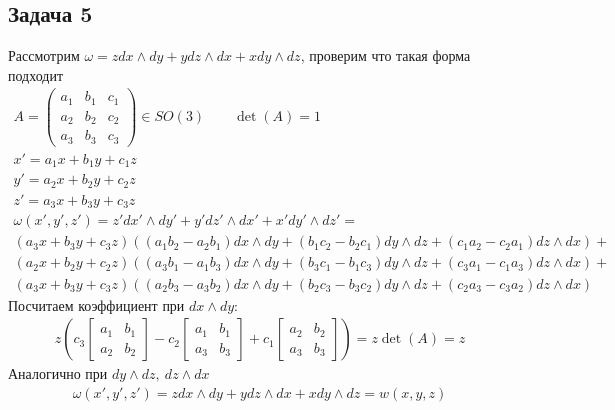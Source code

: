 \subsection*{Задача 5}
	Рассмотрим $\omega = z dx \wedge dy + y dz \wedge dx + x dy \wedge dz$, проверим что такая форма подходит
	\begin{gather*}
		A = 
		\begin{pmatrix}
			a_1 & b_1 & c_1\\
			a_2 & b_2 & c_2\\
			a_3 & b_3 & c_3
		\end{pmatrix}
		\in SO(3)\qquad \det(A) = 1\\
		x' = a_1 x  + b_1 y + c_1 z\\
		y' = a_2 x  + b_2 y + c_2 z\\
		z' = a_3 x  + b_3 y + c_3 z\\
		\omega(x',y',z') = 
		z'dx' \wedge dy'+ y'dz' \wedge dx' + x'dy' \wedge dz' =\\
		\left(a_3x + b_3y + c_3z\right)\left(\left(a_1b_2 - a_2b_1\right)dx \wedge dy + \left(b_1c_2 - b_2c_1\right)dy \wedge dz + \left(c_1a_2 - c_2a_1\right)dz \wedge dx\right) +\\
		\left(a_2x + b_2y + c_2z\right)\left(\left(a_3b_1 - a_1b_3\right)dx \wedge dy + \left(b_3c_1 - b_1c_3\right)dy \wedge dz + \left(c_3a_1 - c_1a_3\right)dz \wedge dx\right) +\\
		\left(a_3x + b_3y + c_3z\right)\left(\left(a_2b_3 - a_3b_2\right)dx \wedge dy + \left(b_2c_3 - b_3c_2\right)dy \wedge dz + \left(c_2a_3 - c_3a_2\right)dz \wedge dx\right)
	\end{gather*}
	Посчитаем коэффициент при $dx \wedge dy$:
	\begin{gather*}
		z\left(
		c_3
		\begin{bmatrix}
			a_1 & b_1 \\ a_2 & b_2
		\end{bmatrix}
		-
		c_2
		\begin{bmatrix}
		a_1 & b_1 \\ a_3 & b_3
		\end{bmatrix}
		+
		c_1
		\begin{bmatrix}
		a_2 & b_2 \\ a_3 & b_3
		\end{bmatrix}
		\right)
		=
		z \det\left(A\right) = z
	\end{gather*}
	Аналогично при $dy \wedge dz,\ dz \wedge dx$
	\begin{gather*}
	\omega\left(x',y',z'\right) = z dx \wedge dy + y dz \wedge dx + x dy \wedge dz = w\left(x,y,z\right)
	\end{gather*}
